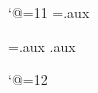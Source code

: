 \catcode`@=11
\newwrite{}
\openout{}=\jobname.aux

=\jobname.aux
\else \jobname.aux\fi{}

\def\writelabel#1#2{%
	\write\reffile{\string\def\string\label@#1{#2}}%
}

\def\label#1{\writelabel{#1}{\the\pageno}}
\def\pageref#1{\csname label@#1\endcsname}
\catcode`@=12
